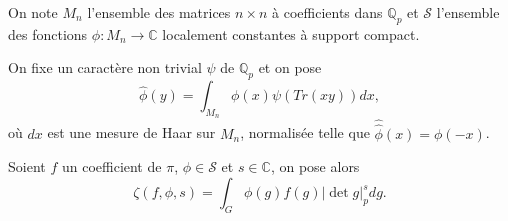 On note $M_n$ l'ensemble des matrices $n \times n$ à coefficients dans $\mathbb{Q}_p$ et $\mathcal{S}$ l'ensemble des fonctions $\phi : M_n \rightarrow \mathbb{C}$ localement constantes à support compact.

On fixe un caractère non trivial $\psi$ de $\mathbb{Q}_p$ et on pose
\begin{equation}
\hat{\phi}(y) = \int_{M_n} \phi(x) \psi(Tr(xy)) dx,
\end{equation}
où $dx$ est une mesure de Haar sur $M_n$, normalisée telle que $\hat{\hat{\phi}}(x)=\phi(-x)$.

\begin{definition}
Soient $f$ un coefficient de $\pi$, $\phi \in \mathcal{S}$ et $s \in \mathbb{C}$, on pose alors
\begin{equation}
\zeta(f, \phi, s) = \int_G \phi(g)f(g)|\det g|_p^s dg.
\end{equation}
\end{definition}

